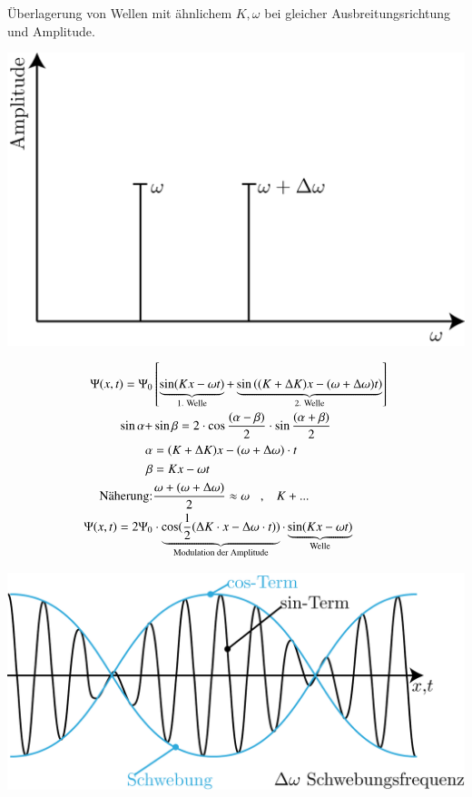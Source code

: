  Überlagerung von Wellen mit ähnlichem $ K,\omega $ bei gleicher Ausbreitungsrichtung und Amplitude.\\
\HL
 \begin{center}
 	\includegraphics[width=0.5\linewidth]{skizzen/19/19B17}
 \end{center}
 \begin{align*}
 	\Psi(x,t) = \Psi_0 &\left[ \underbrace{\sin(Kx-\omega t) }_{\text{1. Welle}}+ \underbrace{\sin\left( (K+\Delta K)x-(\omega+\Delta\omega)t\right) }_{\text{2. Welle}} \right]\\
 	\sin\alpha+&\sin\beta = 2\cdot\cos\frac{(\alpha-\beta)}{2} \cdot \sin\frac{(\alpha+\beta)}{2}\\
 	\alpha &=(K+\Delta K)x-(\omega+\Delta\omega) \cdot t\\
 	\beta &= Kx-\omega t\\
 	\text{Näherung:}& \frac{\omega + (\omega + \Delta\omega)}{2} \approx \omega \hspace{3mm} ,\hspace{3mm} K+...\\
 	\Psi(x,t) = 2 \Psi_0 & \cdot \underbrace{\cos(\frac{1}{2}(\Delta K \cdot x - \Delta\omega\cdot t) )}_{\text{Modulation der Amplitude}} \cdot \underbrace{\sin(Kx-\omega t)}_{\text{Welle}}
 \end{align*}
\begin{center}
	\includegraphics[width=0.5\linewidth]{skizzen/19/19B18}
\end{center}

